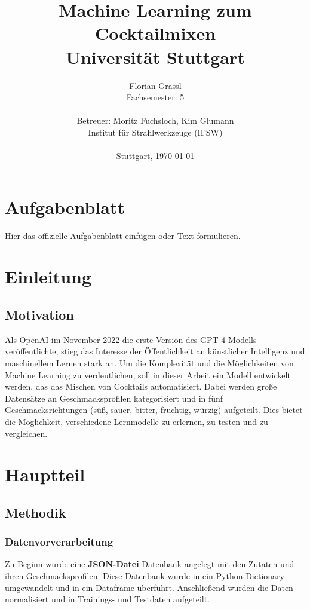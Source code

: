 \documentclass[12pt, a4paper]{report}
\title{
    \vspace{2cm}
    {\LARGE Machine Learning zum Cocktailmixen} \\
    \vspace{1cm}
    {\large Universität Stuttgart} \\
    \vspace{3cm}
}
\author{
   Florian Grassl \\
    Fachsemester: 5 \\
    \vspace{2cm} \\
    Betreuer: Moritz Fuchsloch, Kim Glumann \\
    Institut für Strahlwerkzeuge (IFSW) \\
    \vspace{1cm} \\
    Stuttgart, \today
}
\date{}
\begin{document}

\maketitle
\thispagestyle{empty} %

\chapter*{Aufgabenblatt}
Hier das offizielle Aufgabenblatt einfügen oder Text formulieren.
\newpage

\tableofcontents
\clearpage



\setcounter{page}{1} %

\chapter{Einleitung}
\section{Motivation}

Als OpenAI im November 2022 die erste Version des GPT-4-Modells veröffentlichte, stieg das Interesse der Öffentlichkeit an künstlicher Intelligenz und maschinellem Lernen stark an. Um die Komplexität und die Möglichkeiten von Machine Learning zu verdeutlichen, soll in dieser Arbeit ein Modell entwickelt werden, das das Mischen von Cocktails automatisiert. Dabei werden große Datensätze an Geschmacksprofilen kategorisiert und in fünf Geschmacksrichtungen (süß, sauer, bitter, fruchtig, würzig) aufgeteilt. Dies bietet die Möglichkeit, verschiedene Lernmodelle zu erlernen, zu testen und zu vergleichen.

\chapter{Hauptteil}
\section{Methodik}

\subsection{Datenvorverarbeitung}
Zu Beginn wurde eine \textbf{JSON-Datei}-Datenbank angelegt mit den Zutaten und ihren Geschmacksprofilen. Diese Datenbank wurde in ein Python-Dictionary umgewandelt und in ein Dataframe überführt. Anschließend wurden die Daten normalisiert und in Trainings- und Testdaten aufgeteilt.
\end{document}
